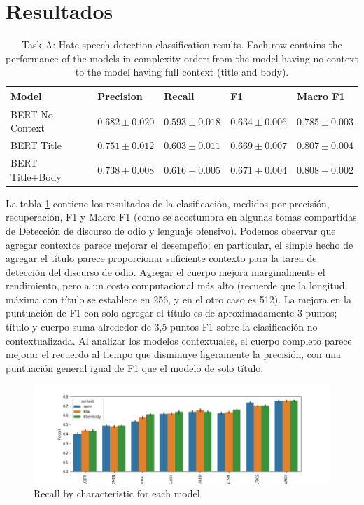 \section{Resultados}


\begin{table}[ht!]
    \centering
    \begin{tabular}{lllll}
        \toprule
        Model &          Precision &             Recall &                 F1 &           Macro F1 \\
        \midrule
        BERT No Context &  $0.682 \pm 0.020$ &  $0.593 \pm 0.018$ &  $0.634 \pm 0.006$ &  $0.785 \pm 0.003$ \\
        BERT Title      &  $0.751 \pm 0.012$ &  $0.603 \pm 0.011$ &  $0.669 \pm 0.007$ &  $0.807 \pm 0.004$ \\
        BERT Title+Body &  $0.738 \pm 0.008$ &  $0.616 \pm 0.005$ &  $0.671 \pm 0.004$ &  $0.808 \pm 0.002$ \\
        \bottomrule
    \end{tabular}


    \caption{Task A: Hate speech detection classification results. Each row contains the performance of the models in complexity order: from the model having no context to the model having full context (title and body). }
    \label{tab:task_a_results}
\end{table}


La tabla \ref{tab:task_a_results} contiene los resultados de la clasificación, medidos por precisión, recuperación, F1 y Macro F1 (como se acostumbra en algunas tomas compartidas de Detección de discurso de odio y lenguaje ofensivo). Podemos observar que agregar contextos parece mejorar el desempeño; en particular, el simple hecho de agregar el título parece proporcionar suficiente contexto para la tarea de detección del discurso de odio. Agregar el cuerpo mejora marginalmente el rendimiento, pero a un costo computacional más alto (recuerde que la longitud máxima con título se establece en 256, y en el otro caso es 512). La mejora en la puntuación de F1 con solo agregar el título es de aproximadamente 3 puntos; título y cuerpo suma alrededor de 3,5 puntos F1 sobre la clasificación no contextualizada. Al analizar los modelos contextuales, el cuerpo completo parece mejorar el recuerdo al tiempo que disminuye ligeramente la precisión, con una puntuación general igual de F1 que el modelo de solo título.

\begin{figure}[t]
    \centering
    \includegraphics[width=\textwidth]{img/recall_category.png}
    \caption{Recall by characteristic for each model}
    \label{fig:recall_by_characteristic}
\end{figure}

